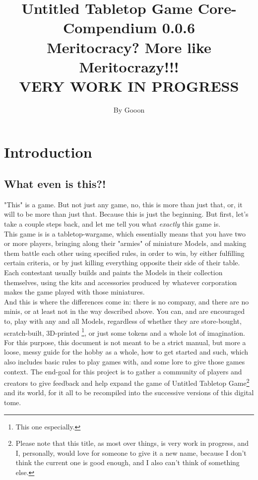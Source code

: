 \documentclass[a4paper,12pt]{report}
\begin{document}
\title{\Large{\textbf{Untitled Tabletop Game Core-Compendium 0.0.6\\ Meritocracy? More like Meritocrazy!!! \\ VERY WORK IN PROGRESS}}}
\author{By Gooon}

\maketitle
\let\cleardoublepage\clearpage
\tableofcontents
\pagebreak

\chapter{Introduction}
\section{What even is this?!}
"This" is a game. But not just any game, no, this is more than just that, or,  it will to be more than just that. Because this is just the beginning. But first, let's take a couple steps back, and let me tell you what \textit{exactly} this game is. \\
This game is is a tabletop-wargame, which essentially means that you have two or more players, bringing along their "armies" of miniature Models, and making them battle each other using specified rules, in order to win, by either fulfilling certain criteria, or by just killing everything opposite their side of their table. Each contestant usually builds and paints the Models in their collection themselves, using the kits and accessories produced by whatever corporation makes the game played with those miniatures. \\
And this is where the differences come in: there is no company, and there are no minis, or at least not in the way described above. You can, and are encouraged to, play with any and all Models, regardless of whether they are store-bought, scratch-built, 3D-printed \footnote{This one especially.}, or just some tokens and a whole lot of imagination. For this purpose, this document is not meant to be a strict manual, but more a loose, messy guide for the hobby as a whole, how to get started and such, which also includes basic rules to play games with, and some lore to give those games context. The end-goal for this project is to gather a community of players and creators to give feedback and help expand the game of Untitled Tabletop Game\footnote{Please note that this title, as most over things, is very work in progress, and I, personally, would love for someone to give it a new name, because I don't think the current one is good enough, and I also can't think of something else.} and its world, for it all to be recompiled into the successive versions of this digital tome.
\end{document}
